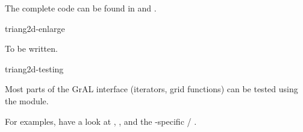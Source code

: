 The complete code can be found in 
and .

\begin{Label}{triang2d-enlarge}
\end{Label}

To be written.

\begin{Label}{triang2d-testing}
\end{Label}

Most parts of the GrAL interface (iterators, grid functions) can be tested using the 
 module.

For examples,
have a look at ,
 ,
and the -specific 
 / .
